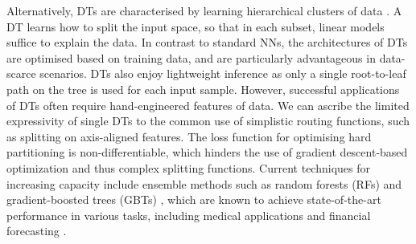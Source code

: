 
Alternatively, DTs are characterised by learning hierarchical clusters of data \cite{criminisi2013decision}. A DT learns how to split the input space, so that in each subset, linear models suffice to explain the data. In contrast to standard NNs, the architectures of DTs are optimised based on training data, and are particularly advantageous in data-scarce scenarios. DTs also enjoy lightweight inference as only a single root-to-leaf path on the tree is used for each input sample. However, successful applications of DTs often require hand-engineered features of data. We can ascribe the limited expressivity of single DTs to the common use of simplistic routing functions, such as splitting on axis-aligned features. The loss function for optimising hard partitioning is non-differentiable, which hinders the use of gradient descent-based optimization and thus complex splitting functions. Current techniques for increasing capacity include ensemble methods such as random forests (RFs) \cite{breiman2001random} and gradient-boosted trees (GBTs) \cite{friedman2001greedy}, which are known to achieve state-of-the-art performance in various tasks, including medical applications and financial forecasting \cite{sandulescu2016predicting,kaggle2017,le2016lifted,volkovs2017content}.

